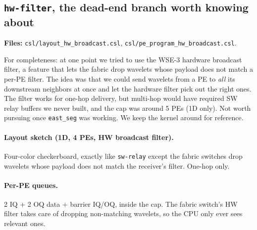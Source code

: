 \documentclass[11pt]{article}
\newcommand{\code}[1]{\texttt{#1}}
\newcommand{\file}[1]{\texttt{#1}}
\begin{document}
\subsection{\code{hw-filter}, the dead-end branch worth knowing about}
\textbf{Files:} \file{csl/layout\_hw\_broadcast.csl},
\file{csl/pe\_program\_hw\_broadcast.csl}.

For completeness: at one point we tried to use the WSE-3
hardware broadcast filter, a feature that lets the fabric
drop wavelets whose payload does not match a per-PE filter. The
idea was that we could send wavelets from a PE to \emph{all} its
downstream neighbors at once and let the hardware filter pick
out the right ones. The filter works for one-hop delivery, but
multi-hop would have required SW relay buffers we never built,
and the cap was around 5 PEs (1D only). Not worth pursuing once
\code{east\_seg} was working. We keep the kernel around for
reference.

\paragraph{Layout sketch (1D, 4 PEs, HW broadcast filter).}
Four-color checkerboard, exactly like \code{sw-relay} except
the fabric switches drop wavelets whose payload does not match
the receiver's filter. One-hop only.

\begin{center}
\end{center}

\paragraph{Per-PE queues.}
2 IQ + 2 OQ data + barrier IQ/OQ, inside the cap. The fabric
switch's HW filter takes care of dropping non-matching
wavelets, so the CPU only ever sees relevant ones.
\end{document}

